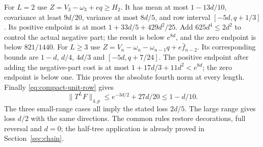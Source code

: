 For $L=2$ use $Z=V_3-\omega_3+eq\ge H_2$.
It has mean at most $1-13d/10$, covariance at least $9d/20$,
variance at most $8d/5$, and row interval $[-5d,q+1/3]$.
Its positive endpoint is at most $1+33d/5+429d^2/25$.
Add $625d^4\le2d^2$ to control the actual negative part;
the result is below $e^{8d}$, and the zero endpoint is below $821/1440$.
For $L\ge3$ use $Z=V_n-\omega_n-\omega_{n-1}q+e\bar f_{n-2}$.
Its corresponding bounds are $1-d$, $d/4$, $4d/3$ and
$[-5d,q+7/24]$. The positive endpoint after adding the negative-part
cost is at most $1+17d/3+11d^2<e^{8d}$; the zero endpoint is below one.
This proves the absolute fourth norm at every length.
Finally \eqref{eq:compact-unit-row} gives
\[
 \|T^LF\|_{4,p}\le e^{-3d/2}+27d/20\le1-d/10.
\]
The three small-range cases all imply the stated loss $2d/5$.
The large range gives loss $d/2$ with the same directions.
The common rules restore decorations, full reversal and $d=0$;
the half-tree application is already proved in Section~\ref{sec:chain}.
